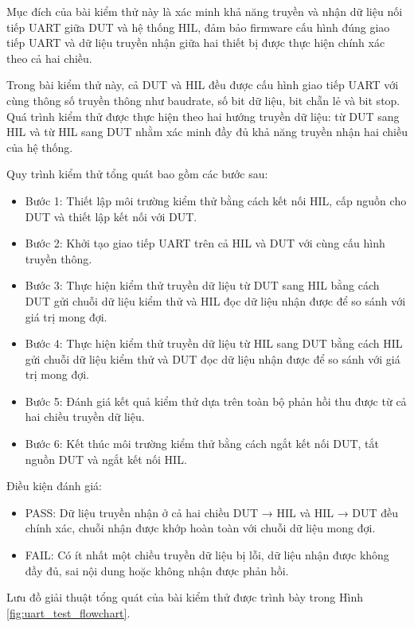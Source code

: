 Mục đích của bài kiểm thử này là xác minh khả năng truyền và nhận dữ liệu nối tiếp UART giữa DUT và hệ thống HIL, đảm bảo firmware cấu hình đúng giao tiếp UART và dữ liệu truyền nhận giữa hai thiết bị được thực hiện chính xác theo cả hai chiều.

Trong bài kiểm thử này, cả DUT và HIL đều được cấu hình giao tiếp UART với cùng thông số truyền thông như baudrate, số bit dữ liệu, bit chẵn lẻ và bit stop. Quá trình kiểm thử được thực hiện theo hai hướng truyền dữ liệu: từ DUT sang HIL và từ HIL sang DUT nhằm xác minh đầy đủ khả năng truyền nhận hai chiều của hệ thống.

Quy trình kiểm thử tổng quát bao gồm các bước sau:

\begin{itemize}
    \item Bước 1: Thiết lập môi trường kiểm thử bằng cách kết nối HIL, cấp nguồn cho DUT và thiết lập kết nối với DUT.
    \item Bước 2: Khởi tạo giao tiếp UART trên cả HIL và DUT với cùng cấu hình truyền thông.
    \item Bước 3: Thực hiện kiểm thử truyền dữ liệu từ DUT sang HIL bằng cách DUT gửi chuỗi dữ liệu kiểm thử và HIL đọc dữ liệu nhận được để so sánh với giá trị mong đợi.
    \item Bước 4: Thực hiện kiểm thử truyền dữ liệu từ HIL sang DUT bằng cách HIL gửi chuỗi dữ liệu kiểm thử và DUT đọc dữ liệu nhận được để so sánh với giá trị mong đợi.
    \item Bước 5: Đánh giá kết quả kiểm thử dựa trên toàn bộ phản hồi thu được từ cả hai chiều truyền dữ liệu.
    \item Bước 6: Kết thúc môi trường kiểm thử bằng cách ngắt kết nối DUT, tắt nguồn DUT và ngắt kết nối HIL.
\end{itemize}

Điều kiện đánh giá:

\begin{itemize}
    \item PASS: Dữ liệu truyền nhận ở cả hai chiều DUT → HIL và HIL → DUT đều chính xác, chuỗi nhận được khớp hoàn toàn với chuỗi dữ liệu mong đợi.
    \item FAIL: Có ít nhất một chiều truyền dữ liệu bị lỗi, dữ liệu nhận được không đầy đủ, sai nội dung hoặc không nhận được phản hồi.
\end{itemize}

Lưu đồ giải thuật tổng quát của bài kiểm thử được trình bày trong Hình \ref{fig:uart_test_flowchart}.

